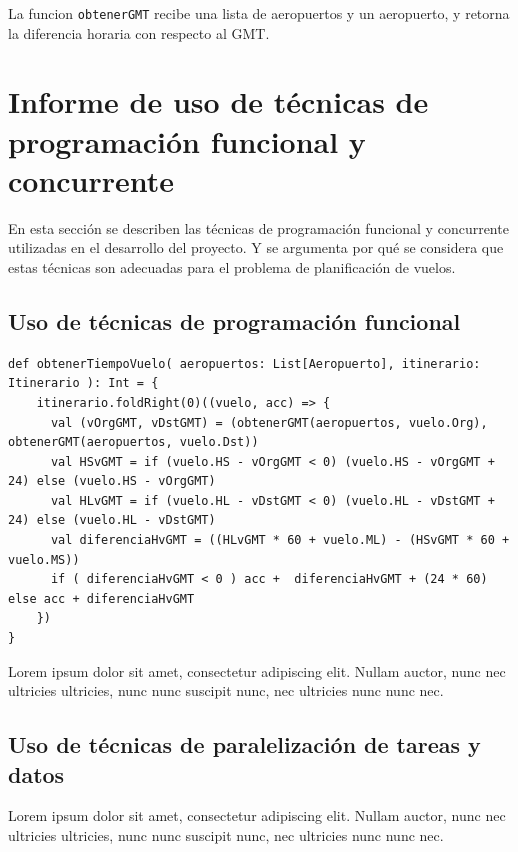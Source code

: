 \documentclass[letterpaper]{article}
\begin{document}
La funcion \texttt{obtenerGMT} recibe una lista de aeropuertos y un aeropuerto, y retorna la diferencia horaria con respecto al GMT.

\section{Informe de uso de técnicas de programación funcional y concurrente}

En esta sección se describen las técnicas de programación funcional y concurrente utilizadas en el desarrollo del proyecto.
Y se argumenta por qué se considera que estas técnicas son adecuadas para el problema de planificación de vuelos. 

\subsection{Uso de técnicas de programación funcional}



\begin{lstlisting}[caption={Función para obtener el tiempo de vuelo}, label={lst:obtenerTiempoVuelo}, captionpos=b]
def obtenerTiempoVuelo( aeropuertos: List[Aeropuerto], itinerario: Itinerario ): Int = {    
    itinerario.foldRight(0)((vuelo, acc) => {
      val (vOrgGMT, vDstGMT) = (obtenerGMT(aeropuertos, vuelo.Org), obtenerGMT(aeropuertos, vuelo.Dst))
      val HSvGMT = if (vuelo.HS - vOrgGMT < 0) (vuelo.HS - vOrgGMT + 24) else (vuelo.HS - vOrgGMT)
      val HLvGMT = if (vuelo.HL - vDstGMT < 0) (vuelo.HL - vDstGMT + 24) else (vuelo.HL - vDstGMT)
      val diferenciaHvGMT = ((HLvGMT * 60 + vuelo.ML) - (HSvGMT * 60 + vuelo.MS))
      if ( diferenciaHvGMT < 0 ) acc +  diferenciaHvGMT + (24 * 60) else acc + diferenciaHvGMT
    })
}
\end{lstlisting}

Lorem ipsum dolor sit amet, consectetur adipiscing elit.
Nullam auctor, nunc nec ultricies ultricies, nunc nunc
suscipit nunc, nec ultricies nunc nunc nec.

\subsection{Uso de técnicas de paralelización de tareas y datos}

Lorem ipsum dolor sit amet, consectetur adipiscing elit.
Nullam auctor, nunc nec ultricies ultricies, nunc nunc
suscipit nunc, nec ultricies nunc nunc nec. 
\end{document}
